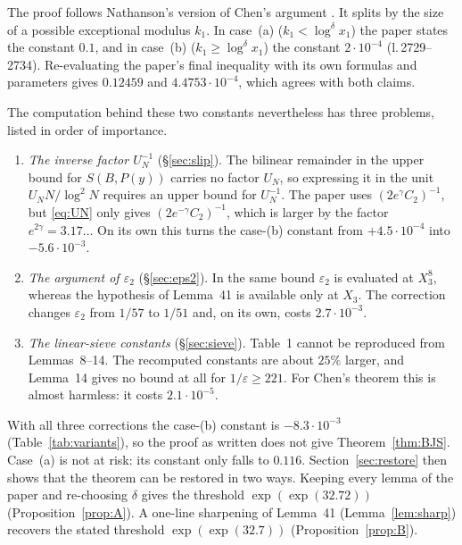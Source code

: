 \documentclass[11pt,a4paper]{amsart}
\theoremstyle{remark}
\newcommand{\eps}{\varepsilon}
\begin{document}
The proof follows Nathanson's version of Chen's argument \cite[Ch.~10]{Nathanson}. It splits by the size of a
possible exceptional modulus $k_1$. In case~(a) ($k_1<\log^{\delta}x_1$) the paper states the constant
$0.1$, and in case~(b) ($k_1\ge\log^{\delta}x_1$) the constant $2\cdot10^{-4}$ (l.\,2729--2734). Re-evaluating
the paper's final inequality with its own formulas and parameters gives $0.12459$ and $4.4753\cdot10^{-4}$,
which agrees with both claims.

The computation behind these two constants nevertheless has three problems, listed in order of importance.
\begin{enumerate}
\item \emph{The inverse factor $U_N^{-1}$} (\S\ref{sec:slip}). The bilinear remainder in the upper bound for
$S(B,P(y))$ carries no factor $U_N$, so expressing it in the unit $U_NN/\log^2N$ requires an upper bound for
$U_N^{-1}$. The paper uses $(2e^{\gamma}C_2)^{-1}$, but \eqref{eq:UN} only gives $(2e^{-\gamma}C_2)^{-1}$, which
is larger by the factor $e^{2\gamma}=3.17\ldots$ On its own this turns the case-(b) constant from
$+4.5\cdot10^{-4}$ into $-5.6\cdot10^{-3}$.
\item \emph{The argument of $\eps_2$} (\S\ref{sec:eps2}). In the same bound $\eps_2$ is evaluated at $X_3^8$,
whereas the hypothesis of Lemma~41 is available only at $X_3$. The correction changes $\eps_2$ from $1/57$ to
$1/51$ and, on its own, costs $2.7\cdot10^{-3}$.
\item \emph{The linear-sieve constants} (\S\ref{sec:sieve}). Table~1 cannot be reproduced from Lemmas~8--14.
The recomputed constants are about $25\%$ larger, and Lemma~14 gives no bound at all for $1/\eps\ge221$. For
Chen's theorem this is almost harmless: it costs $2.1\cdot10^{-5}$.
\end{enumerate}
With all three corrections the case-(b) constant is $-8.3\cdot10^{-3}$ (Table~\ref{tab:variants}), so the
proof as written does not give Theorem~\ref{thm:BJS}. Case~(a) is not at risk: its constant only falls to
$0.116$. Section~\ref{sec:restore} then shows that the theorem can be restored in two ways. Keeping every lemma
of the paper and re-choosing $\delta$ gives the threshold $\exp(\exp(32.72))$ (Proposition~\ref{prop:A}). A
one-line sharpening of Lemma~41 (Lemma~\ref{lem:sharp}) recovers the stated threshold $\exp(\exp(32.7))$
(Proposition~\ref{prop:B}).
\end{document}
